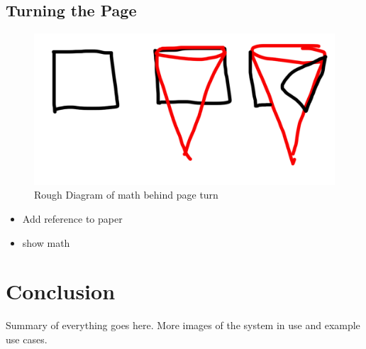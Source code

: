 \documentclass[12pt]{article}
\begin{document}
\subsection{Turning the Page}
\begin{figure}[h]
\includegraphics[width=0.9\linewidth]{TurningThePage}
\caption{Rough Diagram of math behind page turn}
\end{figure}
\begin{itemize}
\item Add reference to paper
\item show math
\end{itemize}


\pagebreak

\section{Conclusion}
Summary of everything goes here. More images of the system in use and example use cases.
\end{document}
